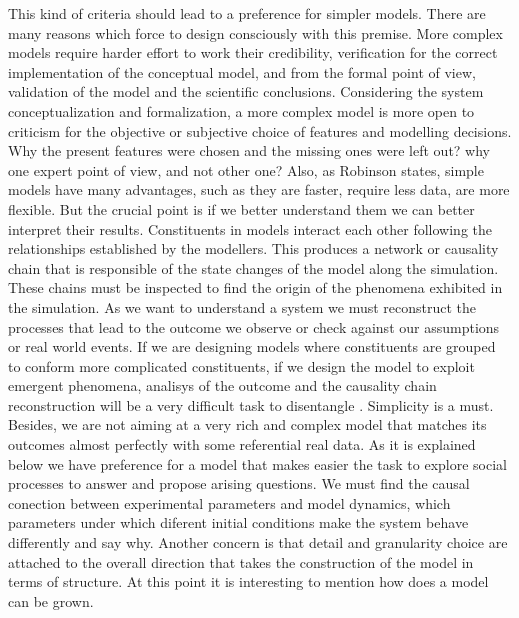 \documentclass[11pt,oneside,a4paper,openright]{report}
\begin{document}
This kind of criteria should lead to a preference for simpler models. There are many reasons which force to design consciously with this premise. More complex models require harder effort to work their credibility, verification
for the correct implementation of the conceptual model, and from the formal point of view, validation of the model and the scientific conclusions. Considering the system conceptualization and formalization, a more complex model is more open to criticism for the objective or subjective choice of features and modelling decisions. Why the present features were chosen and the missing ones were left out? why one expert point of view, and not other one? Also, as Robinson \cite{Robinson2008} states, simple models have many advantages, such as they are faster, require less data, are more flexible. But the crucial point is if we better understand them we can better interpret their results. Constituents in models interact each other following the relationships established by the modellers. This produces a network or causality chain that is responsible of the state changes of the model along the simulation. These chains must be inspected to find the origin of the phenomena exhibited in the simulation. As we want to understand a system we must reconstruct the processes that lead to the outcome we observe or check against our assumptions or real world events. If we are designing models where constituents are grouped to conform more complicated constituents, if we design the model to exploit emergent phenomena, analisys of the outcome and the causality chain reconstruction will be a very difficult task to disentangle \cite[p.31]{Premo2010}\label{myPremo_simplicity}. Simplicity is a must. Besides, we are not aiming at a very rich and complex model that matches its outcomes almost perfectly with some referential real data. As it is explained below we have preference for a model that makes easier the task to explore social processes to answer and propose arising questions. We must find the causal conection between experimental parameters and model dynamics, which parameters under which diferent initial conditions make the system behave differently and say why.
Another concern is that detail and granularity choice are attached to the overall direction that takes the construction of the model in terms of structure. At this point it is interesting to mention how does a model can be grown.\\
\end{document}
